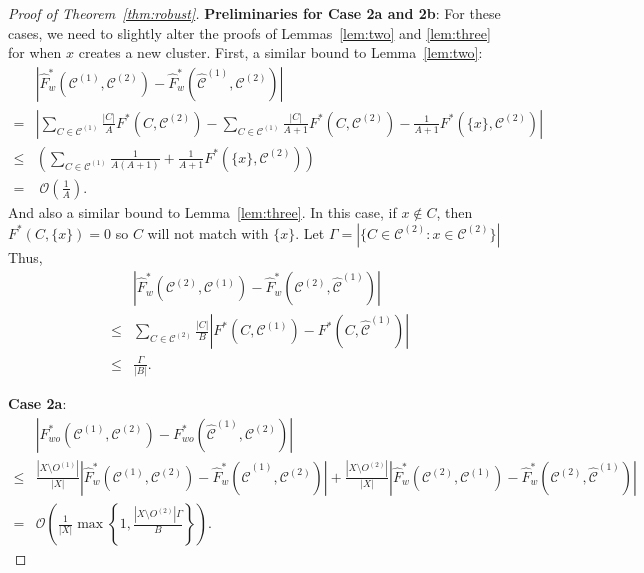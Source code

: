 \documentclass[11pt]{article}
\theoremstyle{remark}
\newcommand\cCone{\mathcal{C}^{(1)}}
\newcommand\hcCone{\hat{\mathcal{C}}^{(1)}}
\newcommand\cCtwo{\mathcal{C}^{(2)}}
\newcommand{\bigO}{\mathcal{O}}
\begin{document}
\begin{proof}[Proof of Theorem~\ref{thm:robust}]
    \textbf{Preliminaries for Case 2a and 2b}:
    For these cases, we need to slightly alter the proofs of Lemmas~\ref{lem:two} and \ref{lem:three} for when $x$ creates a new cluster.
    First, a similar bound to Lemma~\ref{lem:two}:
    \begin{align*}
        & \left| \hat{F}^*_{w}(\cCone, \cCtwo) - \hat{F}^*_{w}(\hcCone, \cCtwo) \right| \\
        = & \left| \sum_{C \in \cCone} \frac{|C|}{A} F^*(C, \cCtwo) - \sum_{C \in \cCone} \frac{|C|}{A+1} F^*(C, \cCtwo) - \frac{1}{A+1} F^*(\{x\}, \cCtwo) \right| \\
        \leq & \left( \sum_{C \in \cCone} \frac{1}{A(A+1)} + \frac{1}{A+1} F^*(\{x\}, \cCtwo)\right) \\
        = & \; \bigO \left( \frac{1}{A} \right).
    \end{align*}
    And also a similar bound to Lemma~\ref{lem:three}.
    In this case, if $x \not \in C$, then $F^*(C, \{x\}) = 0$ so $C$ will not match with $\{x\}$.
    Let $\Gamma = |\{C \in \cCtwo : x \in \cCtwo\}|$
    Thus, 
    \begin{align*}
        & \left|\hat{F}^*_w(\cCtwo, \cCone) - \hat{F}^*_w(\cCtwo, \hcCone)\right|\\
        \leq & \sum_{C \in \cCtwo} \frac{|C|}{B} \left| F^*(C, \cCone) - F^*(C, \hcCone) \right| \\
        \leq & \frac{\Gamma}{|B|}.
    \end{align*}

    \textbf{Case 2a}:
    \begin{align*}
        & \left| F^*_{wo}(\cCone, \cCtwo) - F^*_{wo}(\hcCone, \cCtwo) \right| \\
        \leq & \frac{|X \setminus O^{(1)}|}{|X|}\left|\hat{F}^*_{w}(\cCone, \cCtwo) - \hat{F}^*_{w}(\hcCone, \cCtwo) \right| + \frac{|X \setminus O^{(2)}|}{|X|} \left| \hat{F}^*_w(\cCtwo, \cCone) - \hat{F}^*_w(\cCtwo, \hcCone) \right| \\
        = & \bigO \left( \frac{1}{|X|} \max \left\{ 1, \frac{|X \setminus O^{(2)}| \Gamma }{B} \right\} \right).
    \end{align*}


\end{proof}
\end{document}
